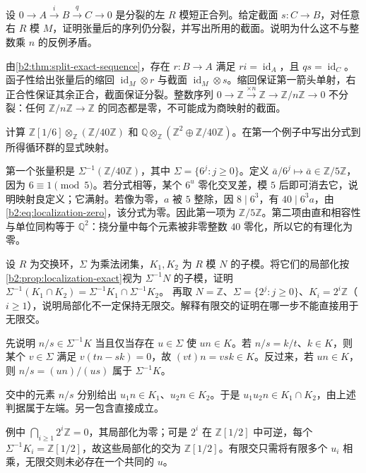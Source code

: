 \begin{exercise}\label{b2:ex:06-split-tensor}
	设 \(0\to A\xrightarrow{i}B\xrightarrow{q}C\to0\) 是分裂的左 \(R\) 模短正合列。给定截面 \(s:C\to B\)，对任意右 \(R\) 模 \(M\)，证明张量后的序列仍分裂，并写出所用的截面。说明为什么这不与整数乘 \(n\) 的反例矛盾。
\end{exercise}
\begin{solution}
	由\cref{b2:thm:split-exact-sequence}，存在 \(r:B\to A\) 满足 \(ri=\operatorname{id}_A\)，且 \(qs=\operatorname{id}_C\)。函子性给出张量后的缩回 \(\operatorname{id}_M\otimes r\) 与截面 \(\operatorname{id}_M\otimes s\)。缩回保证第一箭头单射，右正合性保证其余正合，截面保证分裂。整数序列 \(0\to\mathbb Z\xrightarrow{\times n}\mathbb Z\to\mathbb Z/n\mathbb Z\to0\) 不分裂：任何 \(\mathbb Z/n\mathbb Z\to\mathbb Z\) 的同态都是零，不可能成为商映射的截面。
\end{solution}

\begin{exercise}\label{b2:ex:06-localization-calculation}
	计算 \(\mathbb Z[1/6]\otimes_{\mathbb Z}(\mathbb Z/40\mathbb Z)\) 和 \(\mathbb Q\otimes_{\mathbb Z}(\mathbb Z^2\oplus\mathbb Z/40\mathbb Z)\)。在第一个例子中写出分式到所得循环群的显式映射。
\end{exercise}
\begin{solution}
	第一个张量积是 \(\Sigma^{-1}(\mathbb Z/40\mathbb Z)\)，其中 \(\Sigma=\{6^j:j\ge0\}\)。定义 \(\bar a/6^j\mapsto\bar a\in\mathbb Z/5\mathbb Z\)，因为 \(6\equiv1\pmod5\)。若分式相等，某个 \(6^u\) 零化交叉差，模 \(5\) 后即可消去它，说明映射良定义；它满射。若像为零，\(a\) 被 \(5\) 整除，因 \(8\mid6^3\)，有 \(40\mid6^3a\)，由\eqref{b2:eq:localization-zero}，该分式为零。因此第一项为 \(\mathbb Z/5\mathbb Z\)。第二项由直和相容性与单位同构等于 \(\mathbb Q^2\)：挠分量中每个元素被非零整数 \(40\) 零化，所以它的有理化为零。
\end{solution}

\begin{exercise}\label{b2:ex:06-localization-injective}
	设 \(R\) 为交换环，\(\Sigma\) 为乘法闭集，\(K_1,K_2\) 为 \(R\) 模 \(N\) 的子模。将它们的局部化按\cref{b2:prop:localization-exact}视为 \(\Sigma^{-1}N\) 的子模，证明 \(\Sigma^{-1}(K_1\cap K_2)=\Sigma^{-1}K_1\cap\Sigma^{-1}K_2\)。 再取 \(N=\mathbb Z\)、\(\Sigma=\{2^j:j\ge0\}\)、\(K_i=2^i\mathbb Z\)（\(i\ge1\)），说明局部化不一定保持无限交。解释有限交的证明在哪一步不能直接用于无限交。
\end{exercise}
\begin{solution}
	先说明 \(n/s\in\Sigma^{-1}K\) 当且仅当存在 \(u\in\Sigma\) 使 \(un\in K\)。若 \(n/s=k/t\)、\(k\in K\)，则某个 \(v\in\Sigma\) 满足 \(v(tn-sk)=0\)，故 \((vt)n=vsk\in K\)。反过来，若 \(un\in K\)，则 \(n/s=(un)/(us)\) 属于 \(\Sigma^{-1}K\)。

	交中的元素 \(n/s\) 分别给出 \(u_1n\in K_1\)、\(u_2n\in K_2\)。于是 \(u_1u_2n\in K_1\cap K_2\)，由上述判据属于左端。另一包含直接成立。

	例中 \(\bigcap_{i\ge1}2^i\mathbb Z=0\)，其局部化为零；可是 \(2^i\) 在 \(\mathbb Z[1/2]\) 中可逆，每个 \(\Sigma^{-1}K_i=\mathbb Z[1/2]\)，故这些局部化的交为 \(\mathbb Z[1/2]\)。有限交只需将有限多个 \(u_i\) 相乘，无限交则未必存在一个共同的 \(u\)。
\end{solution}

